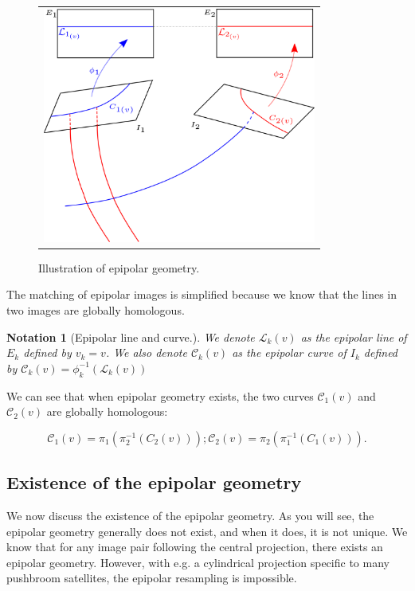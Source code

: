 \documentclass{ipol}
\newcommand{\PiOT}[1]{\pi_1(\pi_2^{-1}(#1))}
\newcommand{\PiTO}[1]{\pi_2(\pi_1^{-1}(#1))}
\newcommand{\LineE}[1]{\ensuremath{\mathcal{L}_{#1}}}
\newcommand{\LineK}{\LineE{k}}
\newcommand{\CurveE}[1]{\ensuremath{\mathcal{C}_{#1}}}
\newcommand{\CurveO}{\CurveE{1}}
\newcommand{\CurveT}{\CurveE{2}}
\newcommand{\CurveK}{\CurveE{k}}
\newtheorem{notation}{Notation}
\newcommand{\er}[1]{\textcolor{orange}{#1}}
\begin{document}
\begin{figure}
\centering
\begin{tabular}{c}
\includegraphics[width=9cm]{FIGS/Epip.png} 
\end{tabular}
\caption{Illustration of epipolar geometry.}
\label{FigDefEpip}
\end{figure}


\noindent The matching of epipolar images is simplified because we know that the lines in two images are globally homologous. 


\begin{notation}[Epipolar line and curve.]
We denote $\LineK(v)$  as the epipolar  line of $E_k$ defined by $v_k=v$. We also denote $\CurveK(v)$ as the epipolar
curve of $I_k$ defined by $\CurveK(v) = \phi_k^{-1}(\LineK(v))$
\end{notation}
%
\noindent We can see that when epipolar geometry exists, the two curves $\CurveO(v)$ and $\CurveT(v)$ are globally homologous:

\begin{equation}
     \CurveO(v) = \PiOT{C_2(v)}   ;  \CurveT(v) = \PiTO{C_1(v)}.\label{Eq:CurvHom}
\end{equation}



\subsection{Existence of the epipolar geometry}\label{ExistEpip} 

We now discuss the existence of the {epipolar geometry}. As you will see, the epipolar geometry generally does not exist, and when it does, it is not
unique. We know that for any image pair following the {central projection}, there exists an epipolar geometry. However, with e.g. a cylindrical projection specific to many pushbroom satellites, the epipolar resampling is impossible.
\end{document}
